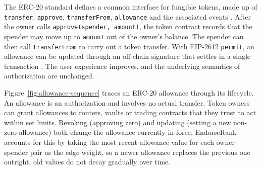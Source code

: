 
The ERC-20 standard defines a common interface for fungible tokens, made up of \texttt{transfer}, \texttt{approve}, \texttt{transferFrom}, \texttt{allowance} and the associated events . After the owner calls \texttt{approve(spender, amount)}, the token contract records that the spender may move up to \texttt{amount} out of the owner's balance. The spender can then call \texttt{transferFrom} to carry out a token transfer. With EIP-2612 \texttt{permit}, an allowance can be updated through an off-chain signature that settles in a single transaction . The user experience improves, and the underlying semantics of authorization are unchanged.

Figure~\ref{fig:allowance-sequence} traces an ERC-20 allowance through its lifecycle. An allowance is an authorization and involves no actual transfer. Token owners can grant allowances to routers, vaults or trading contracts that they trust to act within set limits. Revoking (approving zero) and updating (setting a new non-zero allowance) both change the allowance currently in force. EndorseRank accounts for this by taking the most recent allowance value for each owner--spender pair as the edge weight, so a newer allowance replaces the previous one outright; old values do not decay gradually over time.

